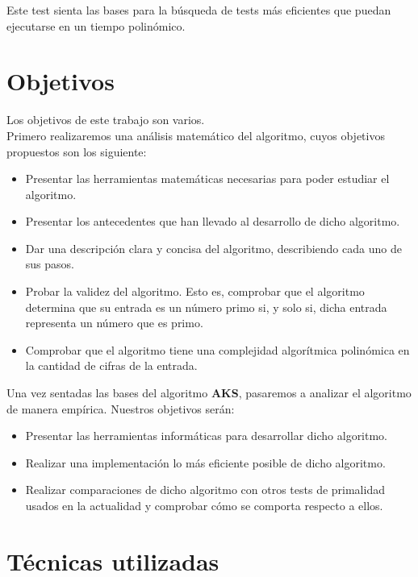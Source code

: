 Este test sienta las bases para la búsqueda de tests más eficientes que puedan ejecutarse en un tiempo polinómico.

\section{Objetivos}

Los objetivos de este trabajo son varios.\\

Primero realizaremos una análisis matemático del algoritmo, cuyos objetivos propuestos son los siguiente:

\begin{itemize}
	\item Presentar las herramientas matemáticas necesarias para poder estudiar el algoritmo.
	
	\item Presentar los antecedentes que han llevado al desarrollo de dicho algoritmo.
	
	\item Dar una descripción clara y concisa del algoritmo, describiendo cada uno de sus pasos.
	
	\item Probar la validez del algoritmo. Esto es, comprobar que el algoritmo determina que su entrada es un número primo si, y solo si, dicha entrada representa un número que es primo.
	
	\item Comprobar que el algoritmo tiene una complejidad algorítmica polinómica en la cantidad de cifras de la entrada.
\end{itemize}

Una vez sentadas las bases del algoritmo \textbf{AKS}, pasaremos a analizar el algoritmo de manera empírica. Nuestros objetivos serán:

\begin{itemize}
	\item Presentar las herramientas informáticas para desarrollar dicho algoritmo.
	
	\item Realizar una implementación lo más eficiente posible de dicho algoritmo.
	
	\item Realizar comparaciones de dicho algoritmo con otros tests de primalidad usados en la actualidad y comprobar cómo se comporta respecto a ellos.
\end{itemize}

\section{Técnicas utilizadas}

